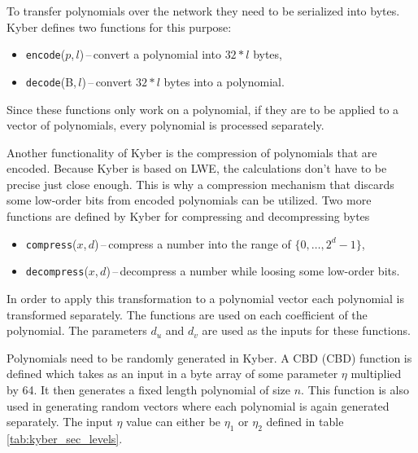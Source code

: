 To transfer polynomials over the network they need to be serialized into bytes. Kyber defines two functions for this purpose:
\begin{itemize}
  \item \texttt{encode}($p$,\,$l$)\,--\,convert a polynomial into $32*l$ bytes,
  \item \texttt{decode}(B,\,$l$)\,--\,convert $32*l$ bytes into a polynomial.
\end{itemize}
Since these functions only work on a polynomial, if they are to be applied to a vector of polynomials, every polynomial is processed separately.

Another functionality of Kyber is the compression of polynomials that are encoded. Because Kyber is based on LWE, the calculations don't have to be precise just close enough. This is why a compression mechanism that discards some low-order bits from encoded polynomials can be utilized. Two more functions are defined by Kyber for compressing and decompressing bytes
\begin{itemize}
  \item \texttt{compress}($x$,\,$d$)\,--\,compress a number into the range of $\{0,\dots,2^d-1\}$,
  \item \texttt{decompress}($x$,\,$d$)\,--\,decompress a number while loosing some low-order bits.
\end{itemize}
In order to apply this transformation to a polynomial vector each polynomial is transformed separately. The functions are used on each coefficient of the polynomial. The parameters $d_u$ and $d_v$ are used as the inputs for these functions.

Polynomials need to be randomly generated in Kyber. A CBD (\acl{CBD}) function is defined which takes as an input in a byte array of some parameter $\eta$ multiplied by 64. It then generates a fixed length polynomial of size $n$. This function is also used in generating random vectors where each polynomial is again generated separately. The input $\eta$ value can either be $\eta_1$ or $\eta_2$ defined in table \ref{tab:kyber_sec_levels}.

